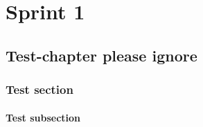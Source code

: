 \part{Sprint 1}
\chapter{Test-chapter please ignore}
\section{Test section}
\subsection{Test subsection}

